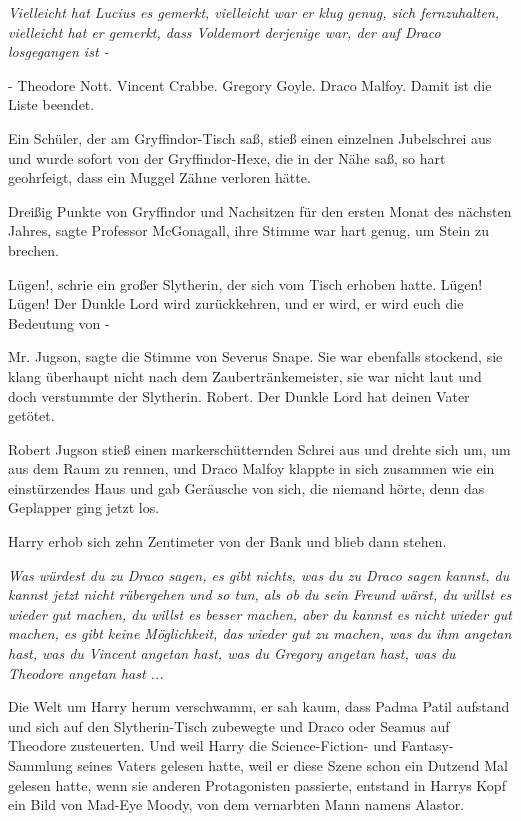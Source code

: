\emph{Vielleicht hat Lucius es gemerkt, vielleicht war er klug genug, sich
fernzuhalten, vielleicht hat er gemerkt, dass Voldemort derjenige war, der auf
Draco losgegangen ist -}

\glqq{}- Theodore Nott. Vincent Crabbe. Gregory Goyle. Draco Malfoy. Damit ist
die Liste beendet.\grqq{}

Ein Schüler, der am Gryffindor-Tisch saß, stieß einen einzelnen Jubelschrei aus
und wurde sofort von der Gryffindor-Hexe, die in der Nähe saß, so hart
geohrfeigt, dass ein Muggel Zähne verloren hätte.

\glqq{}Dreißig Punkte von Gryffindor und Nachsitzen für den ersten Monat des
nächsten Jahres\grqq{}, sagte Professor McGonagall, ihre Stimme war hart genug,
um Stein zu brechen.

\glqq{}Lügen!\grqq{}, schrie ein großer Slytherin, der sich vom Tisch erhoben
hatte. \glqq{}Lügen! Lügen! Der Dunkle Lord wird zurückkehren, und er wird, er
wird euch die Bedeutung von -\grqq{}

\glqq{}Mr. Jugson\grqq{}, sagte die Stimme von Severus Snape. Sie war ebenfalls
stockend, sie klang überhaupt nicht nach dem Zaubertränkemeister, sie war nicht
laut und doch verstummte der Slytherin. \glqq{}Robert. Der Dunkle Lord hat deinen
Vater getötet.\grqq{}

Robert Jugson stieß einen markerschütternden Schrei aus und drehte sich um, um
aus dem Raum zu rennen, und Draco Malfoy klappte in sich zusammen wie ein
einstürzendes Haus und gab Geräusche von sich, die niemand hörte, denn das
Geplapper ging jetzt los.

Harry erhob sich zehn Zentimeter von der Bank und blieb dann stehen.

\emph{Was würdest du zu Draco sagen, es gibt nichts, was du zu Draco sagen
kannst, du kannst jetzt nicht rübergehen und so tun, als ob du sein Freund
wärst, du willst es wieder gut machen, du willst es besser machen, aber du
kannst es nicht wieder gut machen, es gibt keine Möglichkeit, das wieder gut zu
machen, was du ihm angetan hast, was du Vincent angetan hast, was du Gregory
angetan hast, was du Theodore angetan hast ...}

Die Welt um Harry herum verschwamm, er sah kaum, dass Padma Patil aufstand und
sich auf den Slytherin-Tisch zubewegte und Draco oder Seamus auf Theodore
zusteuerten. Und weil Harry die Science-Fiction- und Fantasy-Sammlung seines
Vaters gelesen hatte, weil er diese Szene schon ein Dutzend Mal gelesen hatte,
wenn sie anderen Protagonisten passierte, entstand in Harrys Kopf ein Bild von
Mad-Eye Moody, von dem vernarbten Mann namens Alastor.

